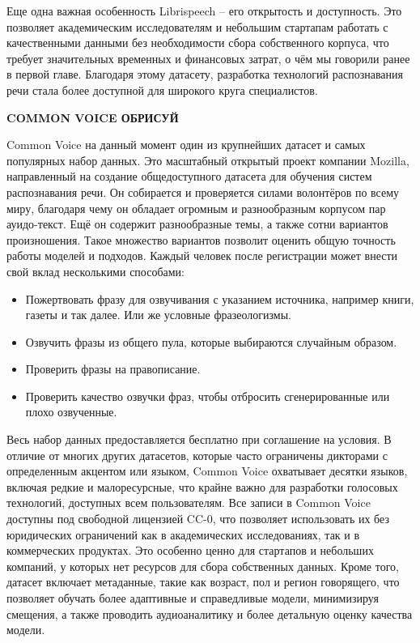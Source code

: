 Еще одна важная особенность Librispeech -- его открытость и доступность.
Это позволяет академическим исследователям и небольшим стартапам работать с качественными данными без необходимости сбора собственного корпуса, что требует значительных временных и финансовых затрат, о чём мы говорили ранее в первой главе.
Благодаря этому датасету, разработка технологий распознавания речи стала более доступной для широкого круга специалистов.

\textbf{COMMON VOICE ОБРИСУЙ}

Common Voice на данный момент один из крупнейших датасет и самых популярных набор данных.
Это масштабный открытый проект компании Mozilla, направленный на создание общедоступного датасета для обучения систем распознавания речи. 
Он собирается и проверяется силами волонтёров по всему миру, благодаря чему он обладает огромным и разнообразным корпусом пар ауидо-текст.
Ещё он содержит разнообразные темы, а также сотни вариантов произношения.
Такое множество вариантов позволит оценить общую точность работы моделей и подходов.
Каждый человек после регистрации может  внести свой вклад несколькими способами:
\begin{itemize}
  \item Пожертвовать фразу для озвучивания с указанием источника, например книги, газеты и так далее.
    Или же условные фразеологизмы.
  \item Озвучить фразы из общего пула, которые выбираются случайным образом.
  \item Проверить фразы на правописание.
  \item Проверить качество озвучки фраз, чтобы отбросить сгенерированные или плохо озвученные.
\end{itemize}
Весь набор данных предоставляется бесплатно при соглашение на условия.
В отличие от многих других датасетов, которые часто ограничены дикторами с определенным акцентом или языком, Common Voice охватывает десятки языков, включая редкие и малоресурсные, что крайне важно для разработки голосовых технологий, доступных всем пользователям.
Все записи в Common Voice доступны под свободной лицензией CC-0, что позволяет использовать их без юридических ограничений как в академических исследованиях, так и в коммерческих продуктах.
Это особенно ценно для стартапов и небольших компаний, у которых нет ресурсов для сбора собственных данных.
Кроме того, датасет включает метаданные, такие как возраст, пол и регион говорящего, что позволяет обучать более адаптивные и справедливые модели, минимизируя смещения, а также проводить аудиоаналитику и более детальную оценку качества модели.

